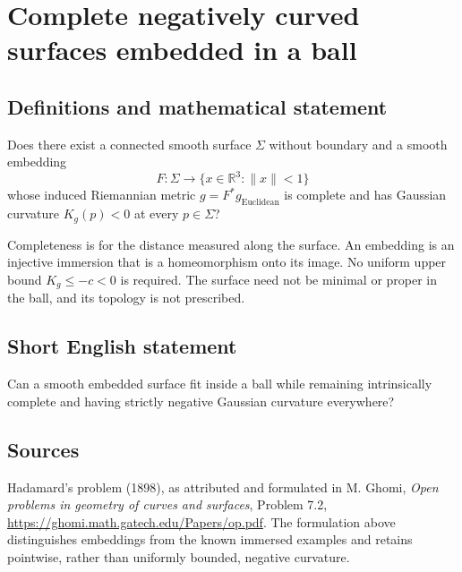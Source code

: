 \documentclass{article}
\begin{document}
\section*{Complete negatively curved surfaces embedded in a ball}
\subsection{Definitions and mathematical statement}
Does there exist a connected smooth surface $\Sigma$ without boundary and
a smooth embedding
\[
 F:\Sigma\longrightarrow\{x\in\mathbb R^3:\lVert x\rVert<1\}
\]
whose induced Riemannian metric $g=F^*g_{\mathrm{Euclidean}}$ is complete
and has Gaussian curvature $K_g(p)<0$ at every $p\in\Sigma$?

Completeness is for the distance measured along the surface.
An embedding is an injective immersion that is a homeomorphism onto its
image. No uniform upper bound $K_g\leq-c<0$ is required. The surface need
not be minimal or proper in the ball, and its topology is not prescribed.
\subsection{Short English statement}
Can a smooth embedded surface fit inside a ball while remaining intrinsically complete and having strictly negative Gaussian curvature everywhere?
\subsection{Sources}
Hadamard's problem (1898), as attributed and formulated in M. Ghomi,
\emph{Open problems in geometry of curves and surfaces}, Problem 7.2,
\url{https://ghomi.math.gatech.edu/Papers/op.pdf}.
The formulation above distinguishes embeddings from the known immersed
examples and retains pointwise, rather than uniformly bounded, negative curvature.
\end{document}
